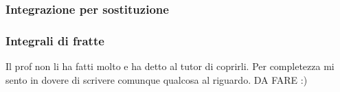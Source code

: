 \subsubsection{Integrazione per sostituzione}


\subsubsection{Integrali di fratte}
Il prof non li ha fatti molto e ha detto al tutor di coprirli. Per completezza mi sento in dovere di scrivere comunque qualcosa al riguardo. DA FARE :) %
